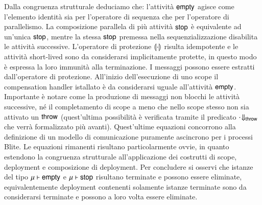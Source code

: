 Dalla congruenza strutturale deduciamo che: l'attività ${\sf empty}$ agisce come
l'elemento identità sia per l'operatore di sequenza che per l'operatore di
parallelismo. La composizione parallela di più attività ${\sf stop}$ è equivalente ad
un'unica ${\sf stop}$, mentre la stessa ${\sf stop}$ premessa nella sequenzializzazione
disabilita le attività successive. L'operatore di protezione $\llparenthesis \cdot\rrparenthesis$
risulta idempotente e le attività short-lived sono da considerarsi implicitamente
protette, in questo modo è espressa la loro immunità alla terminazione. I
messaggi possono essere estratti dall'operatore di protezione.
All'inizio dell'esecuzione di uno scope il compensation handler istallato è da
considerarsi uguale all'attività ${\sf empty}$. Importante è notare come la
produzione di messaggi non blocchi le attività successive, né il completamento
di scope a meno che nello scope stesso non sia attivato un ${\sf throw}$
(quest'ultima possibilità è verificata tramite il predicato ${\sf \cdot}\!\Downarrow_{{\sf throw}}$ che
verrà formalizzato più avanti). Quest'ultime equazioni concorrono alla
definizione di un modello di comunicazione puramente ascincrono per i processi
Blite. Le equazioni rimanenti risultano particolarmente ovvie, in quanto
estendono la congruenza strutturale all'applicazione dei costrutti di scope,
deployment e composizione di deployment. Per concludere si osservi che istanze
del tipo ${\sf \mu} \vdash {\sf empty}$ e ${\sf \mu} \vdash {\sf stop}$ risultano
terminate e possono essere eliminate, equivalentemente deployment contenenti
solamente istanze terminate sono da considerarsi terminate e possono a loro
volta essere eliminate.
\\

